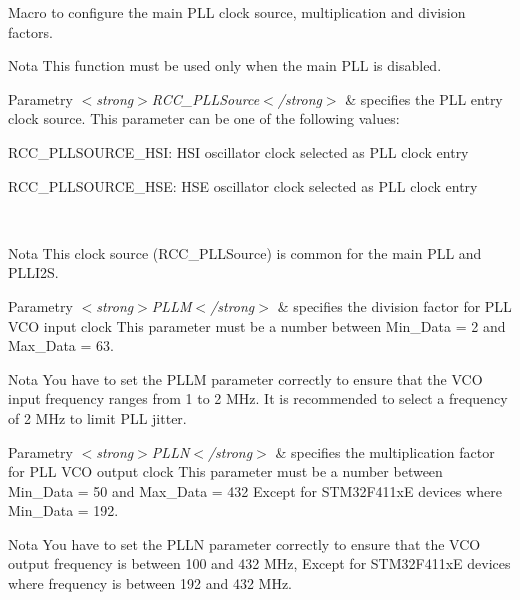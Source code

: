 Macro to configure the main P\+LL clock source, multiplication and division factors. 

\begin{DoxyNote}{Nota}
This function must be used only when the main P\+LL is disabled. 
\end{DoxyNote}

\begin{DoxyParams}{Parametry}
{\em $<$strong$>$\+R\+C\+C\+\_\+\+P\+L\+L\+Source$<$/strong$>$} & specifies the P\+LL entry clock source. This parameter can be one of the following values\+: \begin{DoxyItemize}
\item R\+C\+C\+\_\+\+P\+L\+L\+S\+O\+U\+R\+C\+E\+\_\+\+H\+SI\+: H\+SI oscillator clock selected as P\+LL clock entry \item R\+C\+C\+\_\+\+P\+L\+L\+S\+O\+U\+R\+C\+E\+\_\+\+H\+SE\+: H\+SE oscillator clock selected as P\+LL clock entry \end{DoxyItemize}
\\
\hline
\end{DoxyParams}
\begin{DoxyNote}{Nota}
This clock source (R\+C\+C\+\_\+\+P\+L\+L\+Source) is common for the main P\+LL and P\+L\+L\+I2S. 
\end{DoxyNote}

\begin{DoxyParams}{Parametry}
{\em $<$strong$>$\+P\+L\+L\+M$<$/strong$>$} & specifies the division factor for P\+LL V\+CO input clock This parameter must be a number between Min\+\_\+\+Data = 2 and Max\+\_\+\+Data = 63. \\
\hline
\end{DoxyParams}
\begin{DoxyNote}{Nota}
You have to set the P\+L\+LM parameter correctly to ensure that the V\+CO input frequency ranges from 1 to 2 M\+Hz. It is recommended to select a frequency of 2 M\+Hz to limit P\+LL jitter. 
\end{DoxyNote}

\begin{DoxyParams}{Parametry}
{\em $<$strong$>$\+P\+L\+L\+N$<$/strong$>$} & specifies the multiplication factor for P\+LL V\+CO output clock This parameter must be a number between Min\+\_\+\+Data = 50 and Max\+\_\+\+Data = 432 Except for S\+T\+M32\+F411xE devices where Min\+\_\+\+Data = 192. \\
\hline
\end{DoxyParams}
\begin{DoxyNote}{Nota}
You have to set the P\+L\+LN parameter correctly to ensure that the V\+CO output frequency is between 100 and 432 M\+Hz, Except for S\+T\+M32\+F411xE devices where frequency is between 192 and 432 M\+Hz. 
\end{DoxyNote}

